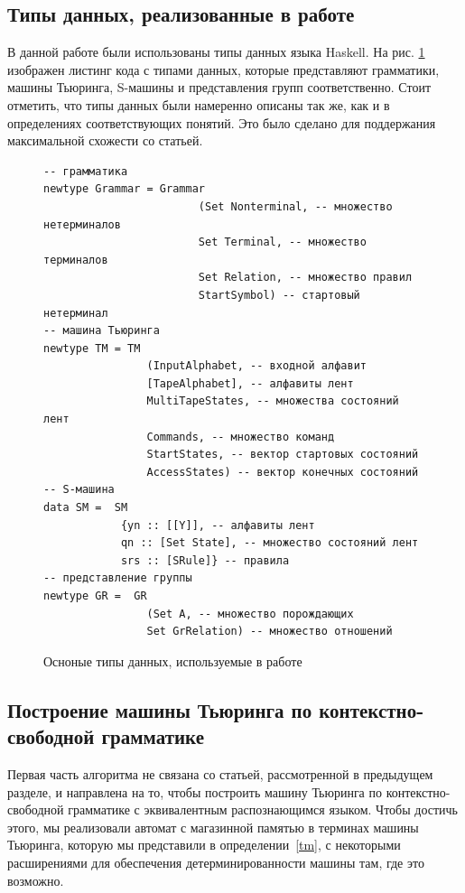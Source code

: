 \documentclass[14pt]{matmex-diploma-custom}
\begin{document}
\subsection{Типы данных, реализованные в работе}
В данной работе были использованы типы данных языка Haskell. На рис. \ref{fig:types} изображен листинг кода с типами данных, которые представляют грамматики, машины Тьюринга, S-машины и представления групп соответственно. Стоит отметить, что типы данных были намеренно описаны так же, как и в определениях соответствующих понятий. Это было сделано для поддержания максимальной схожести со статьей. 

\begin{figure}[H]
\begin{verbatim}
-- грамматика
newtype Grammar = Grammar 
                        (Set Nonterminal, -- множество нетерминалов
                        Set Terminal, -- множество терминалов
                        Set Relation, -- множество правил
                        StartSymbol) -- стартовый нетерминал
-- машина Тьюринга                        
newtype TM = TM 
                (InputAlphabet, -- входной алфавит
                [TapeAlphabet], -- алфавиты лент
                MultiTapeStates, -- множества состояний лент
                Commands, -- множество команд
                StartStates, -- вектор стартовых состояний
                AccessStates) -- вектор конечных состояний
-- S-машина                
data SM =  SM 
            {yn :: [[Y]], -- алфавиты лент
            qn :: [Set State], -- множество состояний лент
            srs :: [SRule]} -- правила
-- представление группы        
newtype GR =  GR 
                (Set A, -- множество порождающих
                Set GrRelation) -- множество отношений
\end{verbatim}
\caption{Осноные типы данных, используемые в работе}
\label{fig:types}
\end{figure}

\subsection{Построение машины Тьюринга по контекстно-свободной грамматике}
Первая часть алгоритма не связана со статьей, рассмотренной в предыдущем разделе, 
и направлена на то, чтобы построить машину Тьюринга по контекстно-свободной грамматике 
с эквивалентным распознающимся языком.
Чтобы достичь этого, мы реализовали автомат с магазинной памятью в терминах машины Тьюринга, 
которую мы представили в определении~\ref{tm}, с некоторыми 
расширениями для обеспечения детерминированности машины там, где это возможно.
\end{document}
